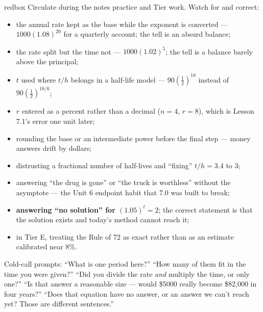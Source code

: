 \documentclass[10pt]{article}
\begin{document}
\begin{skillbox}{redbox}
Circulate during the notes practice and Tier work. Watch for and correct:
\begin{itemize}[leftmargin=1.2em, nosep]
  \item the annual rate kept as the base while the exponent is converted --- $1000(1.08)^{20}$ for a quarterly account; the tell is an absurd balance;
  \item the rate split but the time not --- $1000(1.02)^{5}$; the tell is a balance barely above the principal;
  \item $t$ used where $t/h$ belongs in a half-life model --- $90\left(\frac12\right)^{18}$ instead of $90\left(\frac12\right)^{18/6}$;
  \item $r$ entered as a percent rather than a decimal ($n=4$, $r=8$), which is Lesson 7.1's error one unit later;
  \item rounding the base or an intermediate power before the final step --- money answers drift by dollars;
  \item distrusting a fractional number of half-lives and ``fixing'' $t/h=3.4$ to $3$;
  \item answering ``the drug is gone'' or ``the truck is worthless'' without the asymptote --- the Unit 6 endpoint habit that 7.0 was built to break;
  \item \textbf{answering ``no solution'' for $(1.05)^{t}=2$}; the correct statement is that the solution exists and today's method cannot reach it;
  \item in Tier E, treating the Rule of 72 as exact rather than as an estimate calibrated near $8\%$.
\end{itemize}
Cold-call prompts: ``What is one period here?'' ``How many of them fit in the time you were given?''
``Did you divide the rate \emph{and} multiply the time, or only one?'' ``Is that answer a reasonable
size --- would \$5000 really become \$82{,}000 in four years?'' ``Does that equation have no answer, or
an answer we can't reach yet? Those are different sentences.''
\end{skillbox}
\end{document}
